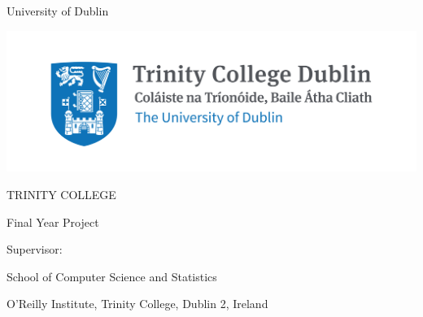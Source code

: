 \thispagestyle{empty}

{
  \centering

  \sffamily

  {\Large University of Dublin}

  \vspace{10pt}

  \includegraphics[scale=0.7]{tcd/trinitycollege.jpg}

  \vspace{10pt}

  {\Huge TRINITY COLLEGE}

  \vspace{80pt}
  
  \textbf{\Large \emph \projecttitle}

  \vspace{30pt}

  \authorname

  \degreetitle

  Final Year Project \datenospace

  Supervisor: \supervisorname

  \vspace{130pt}

  \large{
    School of Computer Science and Statistics

    O'Reilly Institute, Trinity College, Dublin 2, Ireland
  }

}

